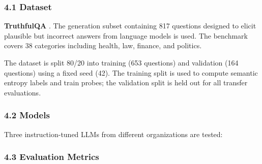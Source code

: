 
\subsubsection{4.1 Dataset}

\textbf{TruthfulQA} \citep{Lin2022TruthfulQA}. The generation subset containing 817 questions designed to elicit plausible but incorrect answers from language models is used. The benchmark covers 38 categories including health, law, finance, and politics.

The dataset is split 80/20 into training (653 questions) and validation (164 questions) using a fixed seed (42). The training split is used to compute semantic entropy labels and train probes; the validation split is held out for all transfer evaluations.

\begin{table}[htbp]
\centering
{}
\end{table}

\subsubsection{4.2 Models}

Three instruction-tuned LLMs from different organizations are tested:

\begin{table}[htbp]
\centering
{}
\end{table}

\subsubsection{4.3 Evaluation Metrics}

